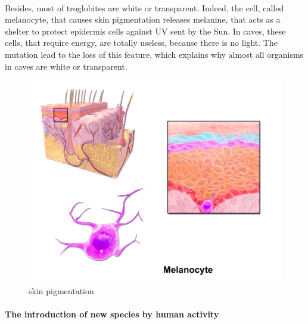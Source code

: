 \documentclass[draft, final]{report}
\begin{document}
\paragraph{}
Besides, most of troglobites are white or transparent. Indeed, the cell, called melanocyte, that causes skin pigmentation releases melanine, that acts as a shelter to protect epidermis cells against UV sent by the Sun. In caves, these cells, that require energy, are totally useless, because there is no light. The mutation lead to the loss of this feature, which explains why almost all organisms in caves are white or transparent.
\begin{figure}[!ht]
  \centering
  \includegraphics[scale=0.2]{LateX/Images/melanyne.png}
  \caption{skin pigmentation\cite{melanocyte}}
\end{figure}

\paragraph{The introduction of new species by human activity}
~\\
~\par
\end{document}
